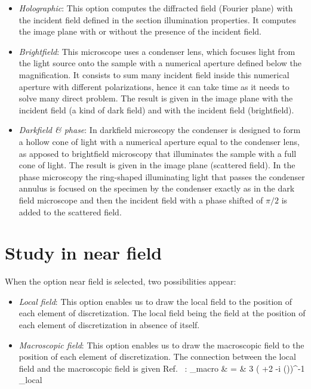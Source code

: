 \begin{itemize}

\item {\it Holographic}: This option computes the diffracted field
  (Fourier plane) with the incident field defined in the section
  illumination properties. It computes the image plane with or without
  the presence of the incident field.


  
\item {\it Brightfield}: This microscope uses a condenser lens, which
  focuses light from the light source onto the sample with a numerical
  aperture defined below the magnification. It consists to sum many
  incident field inside this numerical aperture with different
  polarizations, hence it can take time as it needs to solve many
  direct problem. The result is given in the image plane with the
  incident field (a kind of dark field) and with the incident field
  (brightfield).

\item {\it Darkfield \& phase}: In darkfield microscopy the condenser
  is designed to form a hollow cone of light with a numerical aperture
  equal to the condenser lens, as apposed to brightfield microscopy
  that illuminates the sample with a full cone of light. The result is
  given in the image plane (scattered field). In the phase microscopy
  the ring-shaped illuminating light that passes the condenser annulus
  is focused on the specimen by the condenser exactly as in the dark
  field microscope and then the incident field with a phase shifted of
  $\pi/2$ is added to the scattered field.
  
\end{itemize}

\section{Study in near field}

When the option near field is selected, two possibilities appear:

\begin{itemize}

\item {\it Local field}: This option enables us to draw the local
  field to the position of each element of discretization. The local
  field being the field at the position of each element of
  discretization in absence of itself. 

\item {\it Macroscopic field}: This option enables us to draw the
  macroscopic field to the position of each element of
  discretization. The connection between the local field and the
  macroscopic field is given Ref.~\cite{Chaumet_PRE_04} :
  \be {}_{\rm macro} & = & 3 \left( \varepsilon+2 -i  ()\right)^{-1} _{\rm local} \ee


\end{itemize}

